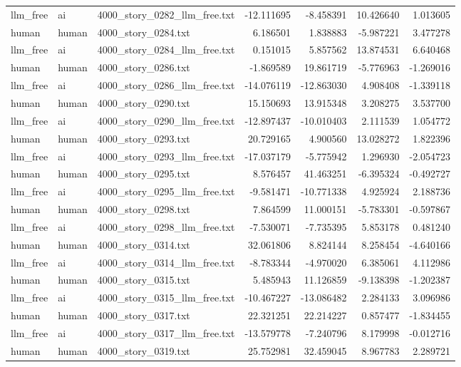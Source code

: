 \begin{longtable}{lllrrrr}
llm\_free & ai & 4000\_story\_0282\_llm\_free.txt & -12.111695 & -8.458391 & 10.426640 & 1.013605 \\
human & human & 4000\_story\_0284.txt & 6.186501 & 1.838883 & -5.987221 & 3.477278 \\
llm\_free & ai & 4000\_story\_0284\_llm\_free.txt & 0.151015 & 5.857562 & 13.874531 & 6.640468 \\
human & human & 4000\_story\_0286.txt & -1.869589 & 19.861719 & -5.776963 & -1.269016 \\
llm\_free & ai & 4000\_story\_0286\_llm\_free.txt & -14.076119 & -12.863030 & 4.908408 & -1.339118 \\
human & human & 4000\_story\_0290.txt & 15.150693 & 13.915348 & 3.208275 & 3.537700 \\
llm\_free & ai & 4000\_story\_0290\_llm\_free.txt & -12.897437 & -10.010403 & 2.111539 & 1.054772 \\
human & human & 4000\_story\_0293.txt & 20.729165 & 4.900560 & 13.028272 & 1.822396 \\
llm\_free & ai & 4000\_story\_0293\_llm\_free.txt & -17.037179 & -5.775942 & 1.296930 & -2.054723 \\
human & human & 4000\_story\_0295.txt & 8.576457 & 41.463251 & -6.395324 & -0.492727 \\
llm\_free & ai & 4000\_story\_0295\_llm\_free.txt & -9.581471 & -10.771338 & 4.925924 & 2.188736 \\
human & human & 4000\_story\_0298.txt & 7.864599 & 11.000151 & -5.783301 & -0.597867 \\
llm\_free & ai & 4000\_story\_0298\_llm\_free.txt & -7.530071 & -7.735395 & 5.853178 & 0.481240 \\
human & human & 4000\_story\_0314.txt & 32.061806 & 8.824144 & 8.258454 & -4.640166 \\
llm\_free & ai & 4000\_story\_0314\_llm\_free.txt & -8.783344 & -4.970020 & 6.385061 & 4.112986 \\
human & human & 4000\_story\_0315.txt & 5.485943 & 11.126859 & -9.138398 & -1.202387 \\
llm\_free & ai & 4000\_story\_0315\_llm\_free.txt & -10.467227 & -13.086482 & 2.284133 & 3.096986 \\
human & human & 4000\_story\_0317.txt & 22.321251 & 22.214227 & 0.857477 & -1.834455 \\
llm\_free & ai & 4000\_story\_0317\_llm\_free.txt & -13.579778 & -7.240796 & 8.179998 & -0.012716 \\
human & human & 4000\_story\_0319.txt & 25.752981 & 32.459045 & 8.967783 & 2.289721 \\

\end{longtable}
